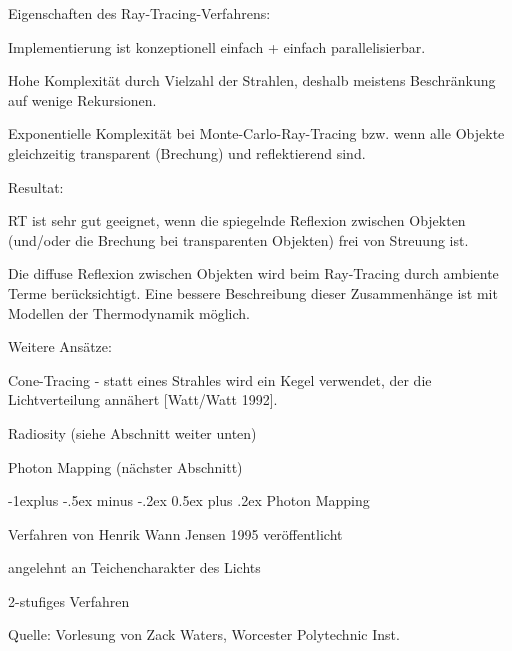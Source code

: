 \documentclass[landscape]{article}
\makeatletter
\renewcommand{\subsection}{\@startsection{subsection}{2}{0mm}%
                                {-1explus -.5ex minus -.2ex}%
                                {0.5ex plus .2ex}%
                                {\normalfont\normalsize\bfseries}}
\makeatother
\begin{document}
\begin{multicols}{3}
\begin{itemize*}
    \item Eigenschaften des Ray-Tracing-Verfahrens:
    \item Implementierung ist konzeptionell einfach + einfach parallelisierbar.
    \item Hohe Komplexität durch Vielzahl der Strahlen, deshalb meistens Beschränkung auf wenige Rekursionen.
    \item Exponentielle Komplexität bei Monte-Carlo-Ray-Tracing bzw. wenn alle Objekte gleichzeitig transparent (Brechung) und reflektierend sind.
    \item Resultat:
    \item RT ist sehr gut geeignet, wenn die spiegelnde Reflexion zwischen Objekten (und/oder die Brechung bei transparenten Objekten) frei von Streuung ist.
    \item Die diffuse Reflexion zwischen Objekten wird beim Ray-Tracing durch ambiente Terme berücksichtigt. Eine bessere Beschreibung dieser Zusammenhänge ist mit Modellen der Thermodynamik möglich.
    \item Weitere Ansätze:
    \item Cone-Tracing - statt eines Strahles wird ein Kegel verwendet, der die Lichtverteilung annähert [Watt/Watt 1992].
    \item Radiosity (siehe Abschnitt weiter unten)
    \item Photon Mapping (nächster Abschnitt)
  \end{itemize*}
  
  \subsection{ Photon Mapping}
  \begin{itemize*}
    \item Verfahren von Henrik Wann Jensen 1995 veröffentlicht
    \item angelehnt an Teichencharakter des Lichts
    \item 2-stufiges Verfahren
    \item Quelle: Vorlesung von Zack Waters, Worcester Polytechnic Inst.
  \end{itemize*}
  
  

\end{multicols}
\end{document}
